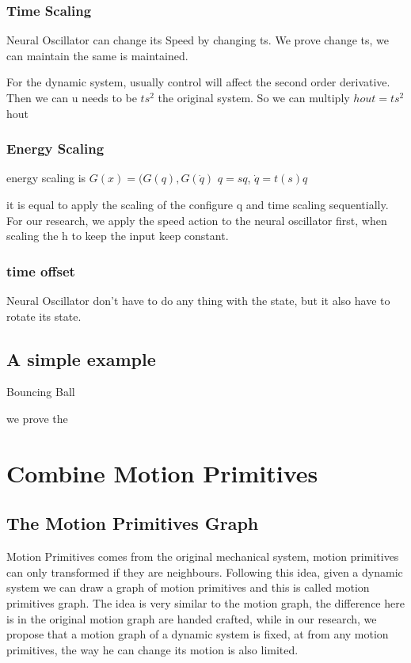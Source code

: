 \subsubsection*{Time Scaling}
Neural Oscillator can change its Speed by changing ts.
We prove change ts, we can maintain the same is maintained.

For the dynamic system, usually control will affect the second order derivative.
Then we can u needs to be $ts^2$ the original system.
So we can multiply $hout=ts^2$ hout

\subsubsection*{ Energy Scaling}
energy scaling is $G(x)=(G(q),G(\dot{q})$
$q=sq$,
$\dot{q}=t(s)q$

it is equal to apply the scaling of the configure q and time scaling sequentially.
For our research, we apply the speed action to the neural oscillator first,
when scaling the h to keep the input keep constant.


\subsubsection*{time offset }
Neural Oscillator don't have to do any thing with the state,
but it also have to rotate its state.


\subsection{A simple example}

Bouncing Ball

we prove the 


\section{Combine Motion Primitives}

\subsection{The Motion Primitives Graph}
Motion Primitives comes from the original mechanical system, motion primitives can only transformed if they are neighbours.
Following this idea, given a dynamic system we can draw a graph of motion primitives and this is called motion primitives graph.
The idea is very similar to the motion graph, the difference here is in the original motion graph are handed  crafted, 
while in our research, we propose that a motion graph of a dynamic system is fixed, at from any motion primitives, the way he can change its motion is also limited.



